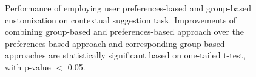 \begin{figure}[!t]
\caption{
Performance of employing user preferences-based and group-based customization on contextual suggestion task. Improvements of combining group-based and preferences-based approach over the preferences-based approach and corresponding group-based approaches are statistically significant based on one-tailed t-test, with p-value $<$ 0.05. \label{fig:Chart1}}
 \end{figure}
